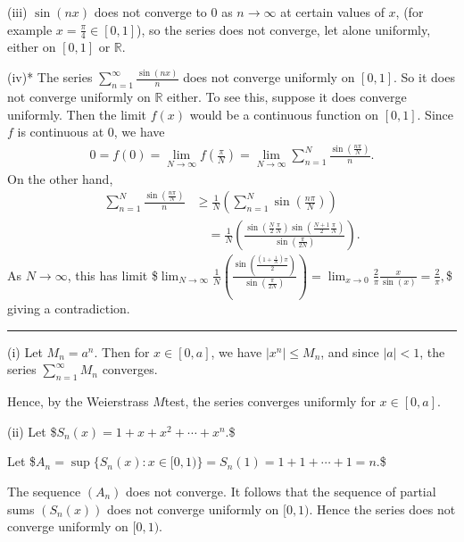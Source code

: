 \documentclass[letterpaper,10pt,english]{jupyterBook}
\begin{document}
\sphinxAtStartPar
(iii) \(\sin (nx)\) does not converge to \(0\) as \(n\rightarrow \infty\) at certain values of \(x\), (for example \(x=\frac{\pi}{4}\in [0,1]\)),  so the series does not converge, let alone uniformly, either on \([0,1]\) or \(\mathbb{R}\).

\sphinxAtStartPar
(iv)* The series \(\sum_{n=1}^\infty  \frac{\sin (nx)}{n}\) does not converge uniformly on \([0,1]\). So it does not converge uniformly on \(\mathbb{R}\) either. To see this, suppose it does converge uniformly. Then the limit \(f(x)\) would be a continuous function on \([0,1]\). Since \(f\) is continuous at \(0\), we have
\begin{equation*}
\begin{split}
0=f(0)=\lim_{N\to\infty} f(\frac{\pi}{N})=\lim_{N\to\infty} \sum_{n=1}^N \frac{\sin\left(\frac{n\pi}{N}\right)}{n}.
\end{split}
\end{equation*}
\sphinxAtStartPar
On the other hand,
\begin{align*}
\sum_{n=1}^N \frac{\sin\left(\frac{n\pi}{N}\right)}{n}&\geq \frac{1}{N}\left( \sum_{n=1}^N \sin\left(\frac{n\pi}{N}\right)\right)\\
&\quad =\frac{1}{N}\left( \frac{\sin(\frac{N}{2}\frac{\pi}{N})\sin(\frac{N+1}{2}\frac{\pi}{N})}{\sin(\frac{\pi}{2N})}\right).
\end{align*}
\sphinxAtStartPar
As \( N\to \infty\), this has limit
\$\(
\lim_{N\to\infty} \frac{1}{N}\left(\frac{\sin(\frac{\left(1+\frac{1}{N}\right)\pi}{2})}{\sin(\frac{\pi}{2N})}\right)
=\lim_{x\to 0}\frac{2}{\pi}\frac{x}{\sin(x)}=\frac{2}{\pi},
\)\$
giving a contradiction.


\bigskip\hrule\bigskip


\sphinxAtStartPar
{\hyperref[\detokenize{Problems:id63}]{}}
(i) Let \(M_n =a^n\). Then for \(x\in [0,a]\), we have \(|x^n|\leq M_n\), and since \(|a|<1\), the series \(\sum_{n=1}^\infty M_n\) converges.

\sphinxAtStartPar
Hence, by the Weierstrass \(M\)\sphinxhyphen{}test, the series converges uniformly for \(x\in [0,a]\).

\sphinxAtStartPar
(ii) Let
\$\(
S_n(x) = 1+x+x^2+\cdots + x^n.
\)\$

\sphinxAtStartPar
Let
\$\(
A_n = \sup \{ S_n (x) : x\in [0,1 ) \} = S_n(1) =1+1 + \cdots + 1 = n.
\)\$

\sphinxAtStartPar
The sequence  \((A_n)\) does not converge. It follows that the sequence of partial sums \((S_n(x))\) does not converge uniformly on \([0,1)\). Hence the series does not converge uniformly on \([0,1)\).
\end{document}
